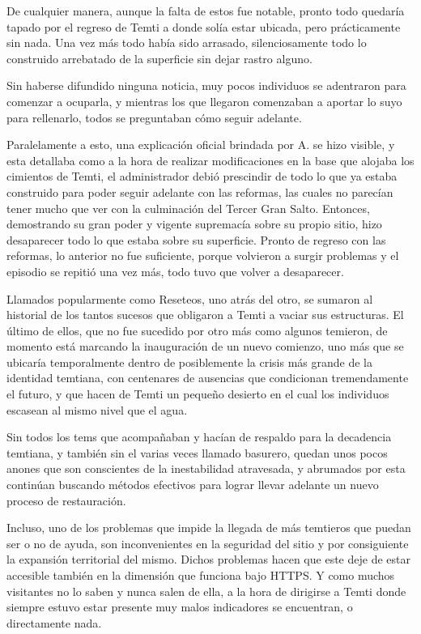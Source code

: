 \documentclass[
]{book}
\begin{document}
De cualquier manera, aunque la falta de estos fue notable, pronto todo quedaría tapado por el regreso de Temti a donde solía estar ubicada, pero prácticamente sin nada. Una vez más todo había sido arrasado, silenciosamente todo lo construido arrebatado de la superficie sin dejar rastro alguno.

Sin haberse difundido ninguna noticia, muy pocos individuos se adentraron para comenzar a ocuparla, y mientras los que llegaron comenzaban a aportar lo suyo para rellenarlo, todos se preguntaban cómo seguir adelante.

Paralelamente a esto, una explicación oficial brindada por A. se hizo visible, y esta detallaba como a la hora de realizar modificaciones en la base que alojaba los cimientos de Temti, el administrador debió prescindir de todo lo que ya estaba construido para poder seguir adelante con las reformas, las cuales no parecían tener mucho que ver con la culminación del Tercer Gran Salto. Entonces, demostrando su gran poder y vigente supremacía sobre su propio sitio, hizo desaparecer todo lo que estaba sobre su superficie. Pronto de regreso con las reformas, lo anterior no fue suficiente, porque volvieron a surgir problemas y el episodio se repitió una vez más, todo tuvo que volver a desaparecer.

Llamados popularmente como Reseteos, uno atrás del otro, se sumaron al historial de los tantos sucesos que obligaron a Temti a vaciar sus estructuras. El último de ellos, que no fue sucedido por otro más como algunos temieron, de momento está marcando la inauguración de un nuevo comienzo, uno más que se ubicaría temporalmente dentro de posiblemente la crisis más grande de la identidad temtiana, con centenares de ausencias que condicionan tremendamente el futuro, y que hacen de Temti un pequeño desierto en el cual los individuos escasean al mismo nivel que el agua.

Sin todos los tems que acompañaban y hacían de respaldo para la decadencia temtiana, y también sin el varias veces llamado basurero, quedan unos pocos anones que son conscientes de la inestabilidad atravesada, y abrumados por esta continúan buscando métodos efectivos para lograr llevar adelante un nuevo proceso de restauración.

Incluso, uno de los problemas que impide la llegada de más temtieros que puedan ser o no de ayuda, son inconvenientes en la seguridad del sitio y por consiguiente la expansión territorial del mismo. Dichos problemas hacen que este deje de estar accesible también en la dimensión que funciona bajo HTTPS. Y como muchos visitantes no lo saben y nunca salen de ella, a la hora de dirigirse a Temti donde siempre estuvo estar presente muy malos indicadores se encuentran, o directamente nada.
\end{document}
